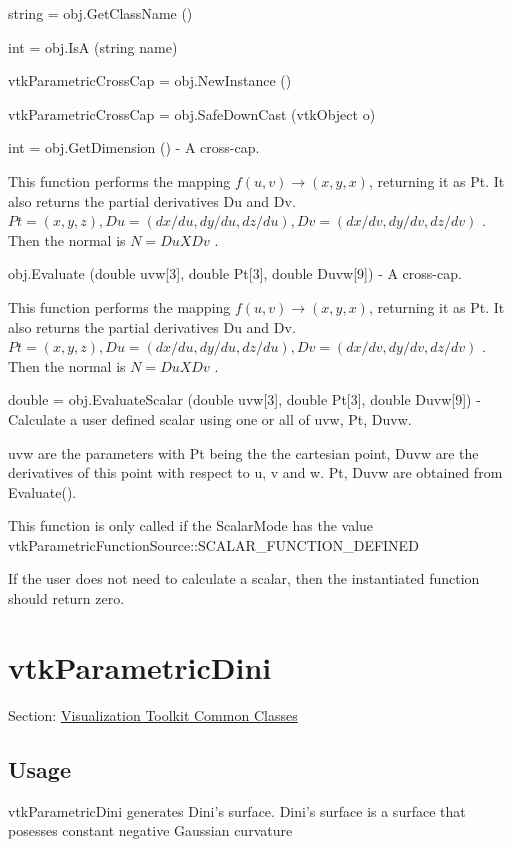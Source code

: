 \begin{DoxyItemize}
\item {\ttfamily string = obj.\-Get\-Class\-Name ()}  
\item {\ttfamily int = obj.\-Is\-A (string name)}  
\item {\ttfamily vtk\-Parametric\-Cross\-Cap = obj.\-New\-Instance ()}  
\item {\ttfamily vtk\-Parametric\-Cross\-Cap = obj.\-Safe\-Down\-Cast (vtk\-Object o)}  
\item {\ttfamily int = obj.\-Get\-Dimension ()} -\/ A cross-\/cap.

This function performs the mapping $f(u,v) \rightarrow (x,y,x)$, returning it as Pt. It also returns the partial derivatives Du and Dv. $Pt = (x, y, z), Du = (dx/du, dy/du, dz/du), Dv = (dx/dv, dy/dv, dz/dv)$ . Then the normal is $N = Du X Dv$ .  
\item {\ttfamily obj.\-Evaluate (double uvw\mbox{[}3\mbox{]}, double Pt\mbox{[}3\mbox{]}, double Duvw\mbox{[}9\mbox{]})} -\/ A cross-\/cap.

This function performs the mapping $f(u,v) \rightarrow (x,y,x)$, returning it as Pt. It also returns the partial derivatives Du and Dv. $Pt = (x, y, z), Du = (dx/du, dy/du, dz/du), Dv = (dx/dv, dy/dv, dz/dv)$ . Then the normal is $N = Du X Dv$ .  
\item {\ttfamily double = obj.\-Evaluate\-Scalar (double uvw\mbox{[}3\mbox{]}, double Pt\mbox{[}3\mbox{]}, double Duvw\mbox{[}9\mbox{]})} -\/ Calculate a user defined scalar using one or all of uvw, Pt, Duvw.

uvw are the parameters with Pt being the the cartesian point, Duvw are the derivatives of this point with respect to u, v and w. Pt, Duvw are obtained from Evaluate().

This function is only called if the Scalar\-Mode has the value vtk\-Parametric\-Function\-Source\-::\-S\-C\-A\-L\-A\-R\-\_\-\-F\-U\-N\-C\-T\-I\-O\-N\-\_\-\-D\-E\-F\-I\-N\-E\-D

If the user does not need to calculate a scalar, then the instantiated function should return zero.


\end{DoxyItemize}\hypertarget{vtkcommon_vtkparametricdini}{}\section{vtk\-Parametric\-Dini}\label{vtkcommon_vtkparametricdini}
Section\-: \hyperlink{sec_vtkcommon}{Visualization Toolkit Common Classes} \hypertarget{vtkwidgets_vtkxyplotwidget_Usage}{}\subsection{Usage}\label{vtkwidgets_vtkxyplotwidget_Usage}
vtk\-Parametric\-Dini generates Dini's surface. Dini's surface is a surface that posesses constant negative Gaussian curvature

